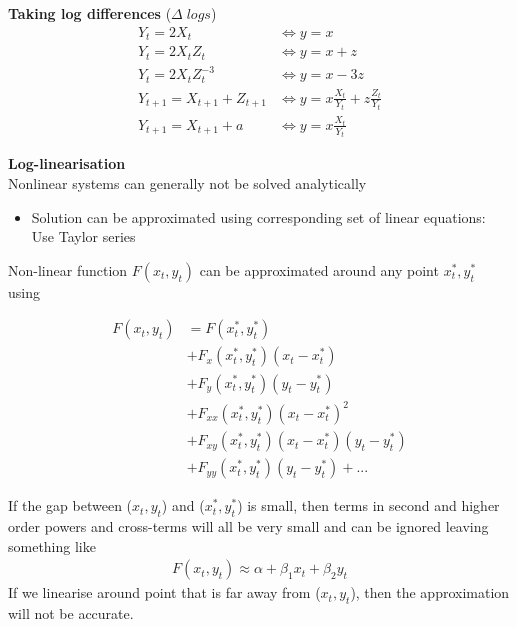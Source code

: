 \documentclass{beamer}
\begin{document}
\begin{frame}
 \textbf{Taking log differences} ($\Delta\;logs$)
 \begin{align*}
   Y_t = 2X_t &\Leftrightarrow y=x\\
   Y_t = 2X_tZ_t &\Leftrightarrow y=x+z\\
   Y_t=2X_tZ_t^{-3} &\Leftrightarrow y=x-3z\\
   Y_{t+1} = X_{t+1} +Z_{t+1} &\Leftrightarrow y=x\frac{X_t}{Y_t}+z\frac{Z_t}{Y_t}\\
   Y_{t+1} = X_{t+1} + a &\Leftrightarrow y=x\frac{X_t}{Y_t}
 \end{align*}
\end{frame}

\begin{frame}
 \textbf{Log-linearisation}\\
 Nonlinear systems can generally not be solved analytically
 \begin{itemize}
   \item Solution can be approximated using corresponding set of linear equations: Use Taylor series
 \end{itemize}
 \medskip
 Non-linear function $F(x_t,y_t)$ can be approximated around any point $x^*_t,y^*_t$ using
 
 \begin{align}
   F(x_t,y_t) &= F(x_t^*,y^*_t)\\ \nonumber
   &+ F_x(x^*_t,y^*_t)(x_t-x^*_t) \\ \nonumber
   &+ F_y(x^*_t,y^*_t)(y_t-y^*_t)\\ \nonumber
   &+ F_{xx}(x^*_t,y^*_t)(x_t- x^*_t)^2\\ \nonumber
   &+ F_{xy}(x^*_t,y^*_t)(x_t−x^*_t) (y_t-y^*_t)\\ \nonumber
   &+ F_{yy}(x^*_t,y^*_t) (y_t-y^*_t) +...
 \end{align}
\end{frame}

\begin{frame}
  If the gap between ($x_t,y_t$) and ($x^*_t,y^*_t$) is small, then terms in second and higher order powers and cross-terms will all be very small and can be ignored leaving something like
\begin{align}
  F(x_t,y_t)\approx \alpha+\beta_1x_t+\beta_2y_t
\end{align}
If we linearise around point that is far away from ($x_t,y_t$), then the approximation will not be accurate.
\end{frame}
\end{document}
